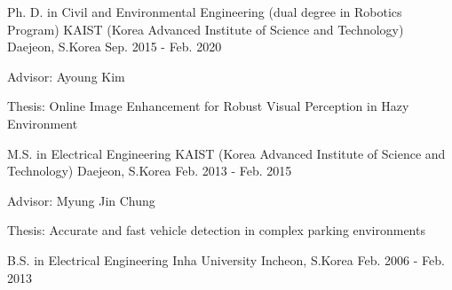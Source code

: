 

\begin{cventries}
    \cventry
    {Ph. D. in Civil and Environmental Engineering (dual degree in Robotics Program)} %
    {KAIST (Korea Advanced Institute of Science and Technology)} %
    {Daejeon, S.Korea} %
    {Sep. 2015 - Feb. 2020} %
    {
      \begin{cvitems} %
        \item {Advisor: Ayoung Kim}
        \item {Thesis: Online Image Enhancement for Robust Visual Perception in Hazy Environment}
      \end{cvitems}
    }

    \cventry
    {M.S. in Electrical Engineering} %
    {KAIST (Korea Advanced Institute of Science and Technology)} %
    {Daejeon, S.Korea} %
    {Feb. 2013 - Feb. 2015} %
    {
      \begin{cvitems} %
          \item {Advisor: Myung Jin Chung}
          \item {Thesis: Accurate and fast vehicle detection in complex parking environments}
     \end{cvitems}
    }

    
    \cventry
    {B.S. in Electrical Engineering} %
    {Inha University} %
    {Incheon, S.Korea} %
    {Feb. 2006 - Feb. 2013} %
    {
    }

    \vspace{-5mm}

\end{cventries}
